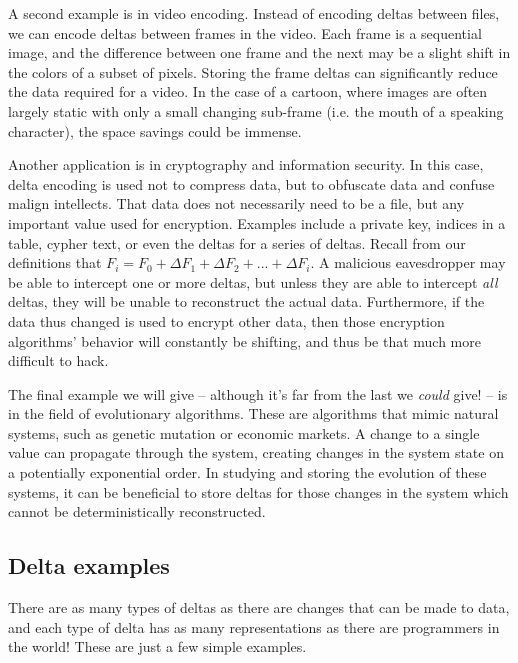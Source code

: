 \documentclass[12pt,a4paper]{article}
\begin{document}
		A second example is in video encoding. Instead of encoding deltas between files, we can encode deltas between frames in the video. Each frame is a sequential image, and the difference between one frame and the next may be a slight shift in the colors of a subset of pixels. Storing the frame deltas can significantly reduce the data required for a video.\cite{BenefitsDeltaEncodingHTTP,DeltaEncodingHTTP} In the case of a cartoon, where images are often largely static with only a small changing sub-frame (i.e. the mouth of a speaking character), the space savings could be immense.
		
		Another application is in cryptography and information security. In this case, delta encoding is used not to compress data, but to obfuscate data and confuse malign intellects. That data does not necessarily need to be a file, but any important value used for encryption. Examples include a private key, indices in a table, cypher text, or even the deltas for a series of deltas.\cite{Crypto} Recall from our definitions that $F_i = F_0 + \Delta F_1 + \Delta F_2 + ... + \Delta F_i$. A malicious eavesdropper may be able to intercept one or more deltas, but unless they are able to intercept \textit{all} deltas, they will be unable to reconstruct the actual data. Furthermore, if the data thus changed is used to encrypt other data, then those encryption algorithms' behavior will constantly be shifting, and thus be that much more difficult to hack.
		
		The final example we will give -- although it's far from the last we \textit{could} give! -- is in the field of evolutionary algorithms. These are algorithms that mimic natural systems, such as genetic mutation or economic markets.\cite{AdaptiveEvolutionary,ParameterEvolutionary} A change to a single value can propagate through the system, creating changes in the system state on a potentially exponential order. In studying and storing the evolution of these systems, it can be beneficial to store deltas for those changes in the system which cannot be deterministically reconstructed.
		
		\subsection{Delta examples}
		
		There are as many types of deltas as there are changes that can be made to data, and each type of delta has as many representations as there are programmers in the world! These are just a few simple examples.\cite{DiffFormat,Myers}
		
\end{document}
